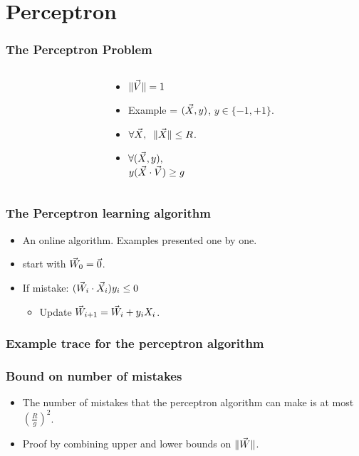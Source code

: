 \documentclass[handout]{beamer}
\begin{document}

\section{Perceptron}

\begin{frame}
\frametitle{The Perceptron Problem}
\begin{columns}
\begin{column}[T]{5.2cm}
\end{column}

\begin{column}[T]{4cm}
\begin{itemize}
\item
$\| \vec{V} \| =1$
\item 
Example = $(\vec{X},y)$, $y \in \{-1,+1\}$.
\item
$\forall \vec{X},\;\; \| \vec{X} \| \leq R$.
\item
$\forall (\vec{X},y),$\\$y(\vec{X} \cdot \vec{V}) \geq g$
\end{itemize}
\end{column}
\end{columns}

\end{frame}

\begin{frame}
\frametitle{The Perceptron learning algorithm}
\begin{itemize}
\item An online algorithm. Examples presented one by one.
\item start with $\vec{W}_0 = \vec{0}$.
\item If mistake: $(\vec{W}_i \cdot \vec{X}_i) y_i \leq  0$
\begin{itemize}
\item Update $\vec{W}_{i+1} = \vec{W}_i + y_i X_i$.
\end{itemize}
\end{itemize}
\end{frame}

\begin{frame}
\frametitle{Example trace for the perceptron algorithm}
\end{frame}

\begin{frame}
\frametitle{Bound on number of mistakes}
\begin{itemize}
\item The number of mistakes that the perceptron algorithm can make is at most
$\left(\frac{R}{g}\right)^2$.
\item Proof by combining upper and lower bounds on $\| \vec{W} \|$.
\end{itemize}
\end{frame}
\end{document}

